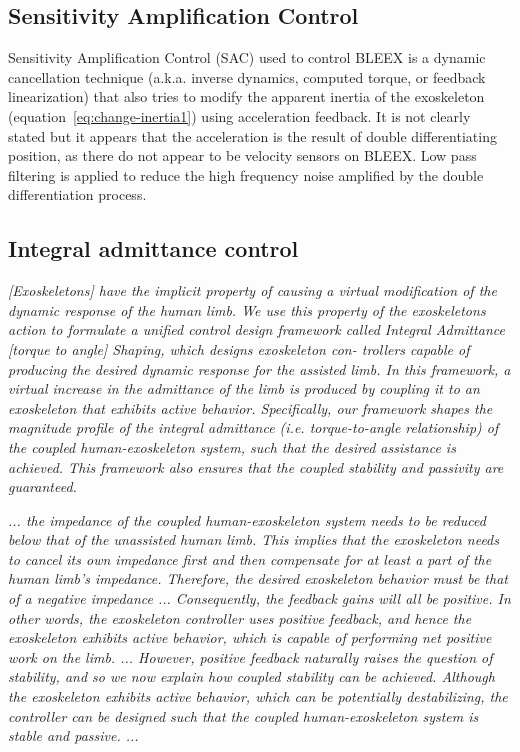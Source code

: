 \documentclass[letterpaper,12pt,fullpage]{article}
\begin{document}
\subsection{Sensitivity Amplification Control}

Sensitivity Amplification Control (SAC) used to control BLEEX
is a dynamic cancellation technique (a.k.a.
inverse dynamics, computed torque, or feedback linearization) that also tries
to modify the apparent inertia of the exoskeleton (equation~\ref{eq:change-inertia1})
using acceleration feedback. It is not clearly stated but it appears that the
acceleration is the result of double differentiating position, as there do not
appear to be velocity sensors on BLEEX. Low pass filtering is applied to reduce
the high frequency noise amplified by the double differentiation process.

\subsection{Integral admittance control}

{\it [Exoskeletons] have the implicit property
of causing a virtual modification of the dynamic response of
the human limb. We use this property of the exoskeletons
action to formulate a unified control design framework called
Integral Admittance [torque to angle] Shaping, which designs exoskeleton con-
trollers capable of producing the desired dynamic response
for the assisted limb. In this framework, a virtual increase
in the admittance of the limb is produced by coupling it
to an exoskeleton that exhibits active behavior. Specifically,
our framework shapes the magnitude profile of the integral
admittance (i.e. torque-to-angle relationship) of the coupled
human-exoskeleton system, such that the desired assistance is
achieved. This framework also ensures that the coupled stability
and passivity are guaranteed.}~\cite{Nagarajan_etal_2015}

{\it ... the impedance of the coupled human-exoskeleton
system needs to be reduced below that of the unassisted
human limb. This implies that the exoskeleton needs to
cancel its own impedance first and then compensate for
at least a part of the human limb’s impedance. Therefore,
the desired exoskeleton behavior must be that of a negative
impedance ... Consequently,
the feedback gains will all be
positive. In other words, the exoskeleton controller uses
positive feedback, and hence the exoskeleton exhibits active
behavior, which is capable of performing net positive work
on the limb. ...
However, positive feedback naturally raises the question of
stability, and so we now explain how coupled stability can be
achieved. Although the exoskeleton exhibits active behavior,
which can be potentially destabilizing, the controller can be
designed such that the coupled human-exoskeleton system
is stable and passive. ... 
}~\cite{Nagarajan_etal_2015}
\end{document}
